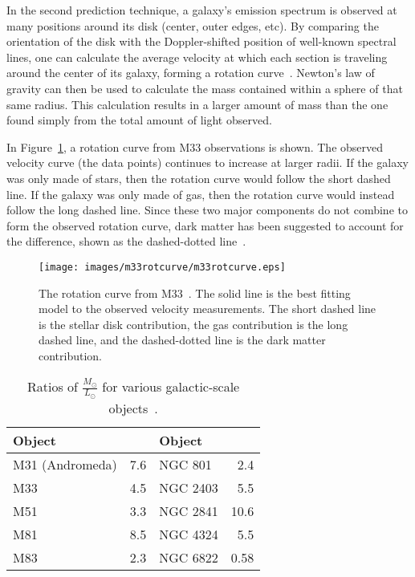 In the second prediction technique, a galaxy's emission spectrum is observed at many positions around its disk (center, outer edges, etc).
By comparing the orientation of the disk with the Doppler-shifted position of well-known spectral lines, one can calculate the average velocity at which each section is traveling around the center of its galaxy, forming a rotation curve~\cite{rotation_curve_review, spiral_galaxy_rot_curve, milkyway_dm_evidence}.
Newton's law of gravity can then be used to calculate the mass contained within a sphere of that same radius.
This calculation results in a larger amount of mass than the one found simply from the total amount of light observed.

In Figure~\ref{fig:m33rotcurve}, a rotation curve from M33 observations is shown.
The observed velocity curve (the data points) continues to increase at larger radii.
If the galaxy was only made of stars, then the rotation curve would follow the short dashed line.
If the galaxy was only made of gas, then the rotation curve would instead follow the long dashed line.
Since these two major components do not combine to form the observed rotation curve, dark matter has been suggested to account for the difference, shown as the dashed-dotted line~\cite{m33rotcurve}.
    
\begin{figure}[bt]
  \centering
  \texttt{[image: images/m33rotcurve/m33rotcurve.eps]}
  \caption[M33 Rotation Curve]{
    The rotation curve from M33~\cite{m33rotcurve}.
    The solid line is the best fitting model to the observed velocity measurements.
    The short dashed line is the stellar disk contribution, the gas contribution is the long dashed line, and the dashed-dotted line is the dark matter contribution.
  }
  \label{fig:m33rotcurve}
\end{figure}

\begin{table}[h]
  \centering
  \caption[Ratios of $\frac{\textrm{M}_\odot}{\textrm{L}_\odot}$ for Various Galactic-scale Objects]{Ratios of $\frac{M_\odot}{L_\odot}$ for various galactic-scale objects~\cite{faber_ml}.}
  \label{tab:mlratios}
  \begin{tabular}{l r | l r}
    Object      &  \mlratio{} & Object & \mlratio{} \\
    \hline
    M31 (Andromeda) &  7.6  & NGC 801  &  2.4  \\
    M33             &  4.5  & NGC 2403 &  5.5  \\
    M51             &  3.3  & NGC 2841 & 10.6  \\
    M81             &  8.5  & NGC 4324 &  5.5  \\
    M83             &  2.3  & NGC 6822 &  0.58 \\
  \end{tabular}
\end{table}
      
